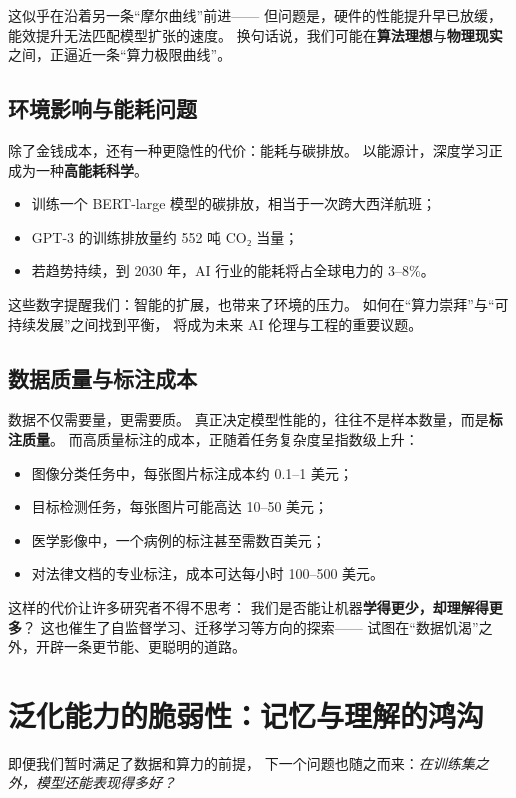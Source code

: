 这似乎在沿着另一条“摩尔曲线”前进——  
但问题是，硬件的性能提升早已放缓，能效提升无法匹配模型扩张的速度。  
换句话说，我们可能在\textbf{算法理想}与\textbf{物理现实}之间，正逼近一条“算力极限曲线”。

\subsection{环境影响与能耗问题}

除了金钱成本，还有一种更隐性的代价：能耗与碳排放。  
以能源计，深度学习正成为一种\textbf{高能耗科学}。  
\begin{itemize}
\item 训练一个 BERT-large 模型的碳排放，相当于一次跨大西洋航班；
\item GPT-3 的训练排放量约 552 吨 CO₂ 当量；
\item 若趋势持续，到 2030 年，AI 行业的能耗将占全球电力的 3--8\%。
\end{itemize}
这些数字提醒我们：智能的扩展，也带来了环境的压力。  
如何在“算力崇拜”与“可持续发展”之间找到平衡，  
将成为未来 AI 伦理与工程的重要议题。

\subsection{数据质量与标注成本}

数据不仅需要量，更需要质。  
真正决定模型性能的，往往不是样本数量，而是\textbf{标注质量}。  
而高质量标注的成本，正随着任务复杂度呈指数级上升：  

\begin{itemize}
\item 图像分类任务中，每张图片标注成本约 0.1--1 美元；
\item 目标检测任务，每张图片可能高达 10--50 美元；
\item 医学影像中，一个病例的标注甚至需数百美元；
\item 对法律文档的专业标注，成本可达每小时 100--500 美元。
\end{itemize}

这样的代价让许多研究者不得不思考：  
我们是否能让机器\textbf{学得更少，却理解得更多}？  
这也催生了自监督学习、迁移学习等方向的探索——  
试图在“数据饥渴”之外，开辟一条更节能、更聪明的道路。

\section{泛化能力的脆弱性：记忆与理解的鸿沟}

即便我们暂时满足了数据和算力的前提，  
下一个问题也随之而来：\textit{在训练集之外，模型还能表现得多好？}  

